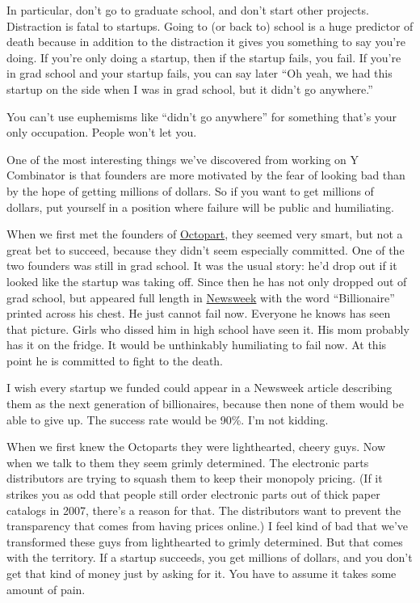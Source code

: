 \documentclass[12pt]{book}
\begin{document}
In particular, don't go to graduate school, and don't start other
projects. Distraction is fatal to startups. Going to (or back to) school
is a huge predictor of death because in addition to the distraction it
gives you something to say you're doing. If you're only doing a startup,
then if the startup fails, you fail. If you're in grad school and your
startup fails, you can say later ``Oh yeah, we had this startup on the
side when I was in grad school, but it didn't go anywhere.''

You can't use euphemisms like ``didn't go anywhere'' for something
that's your only occupation. People won't let you.

One of the most interesting things we've discovered from working on Y
Combinator is that founders are more motivated by the fear of looking
bad than by the hope of getting millions of dollars. So if you want to
get millions of dollars, put yourself in a position where failure will
be public and humiliating.

When we first met the founders of \href{http://octopart.com}{Octopart},
they seemed very smart, but not a great bet to succeed, because they
didn't seem especially committed. One of the two founders was still in
grad school. It was the usual story: he'd drop out if it looked like the
startup was taking off. Since then he has not only dropped out of grad
school, but appeared full length in
\href{http://docs.octopart.com/newsweek_octopart_small.jpg}{Newsweek}
with the word ``Billionaire'' printed across his chest. He just cannot
fail now. Everyone he knows has seen that picture. Girls who dissed him
in high school have seen it. His mom probably has it on the fridge. It
would be unthinkably humiliating to fail now. At this point he is
committed to fight to the death.

I wish every startup we funded could appear in a Newsweek article
describing them as the next generation of billionaires, because then
none of them would be able to give up. The success rate would be 90\%.
I'm not kidding.

When we first knew the Octoparts they were lighthearted, cheery guys.
Now when we talk to them they seem grimly determined. The electronic
parts distributors are trying to squash them to keep their monopoly
pricing. (If it strikes you as odd that people still order electronic
parts out of thick paper catalogs in 2007, there's a reason for that.
The distributors want to prevent the transparency that comes from having
prices online.) I feel kind of bad that we've transformed these guys
from lighthearted to grimly determined. But that comes with the
territory. If a startup succeeds, you get millions of dollars, and you
don't get that kind of money just by asking for it. You have to assume
it takes some amount of pain.
\end{document}
